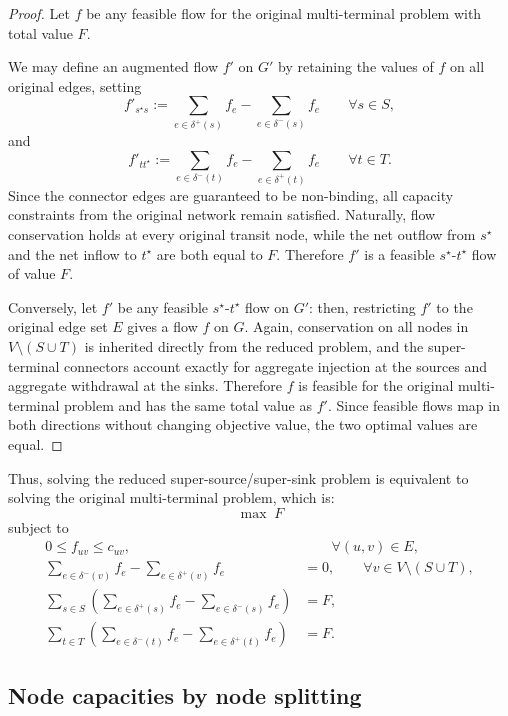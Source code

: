 \documentclass[12pt]{report}
\begin{document}
\begin{proof}
Let \(f\) be any feasible flow for the original multi-terminal problem with total value \(F\).

We may define an augmented flow \(f'\) on \(G'\) by retaining the values of \(f\) on all original edges, setting
\[
f'_{s^\star s}:=\sum_{e\in\delta^+(s)} f_e - \sum_{e\in\delta^-(s)} f_e \qquad \forall s\in S,
\]
and
\[
f'_{t t^\star}:=\sum_{e\in\delta^-(t)} f_e - \sum_{e\in\delta^+(t)} f_e \qquad \forall t\in T.
\]
Since the connector edges are guaranteed to be non-binding, all capacity constraints from the original network remain satisfied. Naturally, flow conservation holds at every original transit node, while the net outflow from \(s^\star\) and the net inflow to \(t^\star\) are both equal to \(F\). Therefore \(f'\) is a feasible \(s^\star\)-\(t^\star\) flow of value \(F\).

Conversely, let \(f'\) be any feasible \(s^\star\)-\(t^\star\) flow on \(G'\): then, restricting \(f'\) to the original edge set \(E\) gives a flow \(f\) on \(G\). Again, conservation on all nodes in \(V\setminus(S\cup T)\) is inherited directly from the reduced problem, and the super-terminal connectors account exactly for aggregate injection at the sources and aggregate withdrawal at the sinks. Therefore \(f\) is feasible for the original multi-terminal problem and has the same total value as \(f'\). Since feasible flows map in both directions without changing objective value, the two optimal values are equal.
\end{proof}

Thus, solving the reduced super-source/super-sink problem is equivalent to solving the original multi-terminal problem, which is:
\[
\max\; F
\]
subject to
\begin{align}
0 \le f_{uv} \le c_{uv}, &\qquad \forall (u,v)\in E, \\
\sum_{e\in\delta^-(v)} f_e - \sum_{e\in\delta^+(v)} f_e &= 0,
\qquad \forall v\in V\setminus(S\cup T), \label{eq:msss-transit}\\
\sum_{s\in S}\left(\sum_{e\in\delta^+(s)} f_e - \sum_{e\in\delta^-(s)} f_e\right) &= F, \label{eq:msss-source}\\
\sum_{t\in T}\left(\sum_{e\in\delta^-(t)} f_e - \sum_{e\in\delta^+(t)} f_e\right) &= F. \label{eq:msss-sink}
\end{align}


\subsection{Node capacities by node splitting}
\label{sec:node_splitting}
\end{document}
